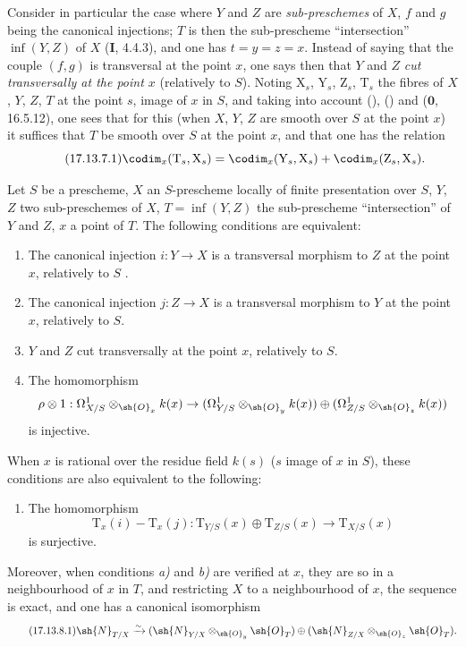 \begin{env}[17.13.7]
\label{IV.17.13.7}
Consider in particular the case where $Y$ and $Z$ are \emph{sub-preschemes} of $X$, $f$ and $g$ being the canonical injections; $T$ is then the sub-prescheme ``intersection'' $\inf(Y,Z)$ of $X$ (\textbf{I}, 4.4.3), and one has $t=y=z=x$.
Instead of saying that the couple $(f,g)$ is transversal at the point $x$, one says then that $Y$ and $Z$ \emph{cut transversally at the point $x$} (relatively to $S$).
Noting $\mathrm{X}_s$, $\mathrm{Y}_s$, $\mathrm{Z}_s$, $\mathrm{T}_s$ the fibres of $X$, $Y$, $Z$, $T$ at the point $s$, image of $x$ in $S$, and taking into account (), () and ($\mathbf{0}$, 16.5.12), one sees that for this (when $X$, $Y$, $Z$ are smooth over $S$ at the point $x$) it suffices that $T$ be smooth over $S$ at the point $x$, and that one has the relation
\[
\label{IV.17.13.7.1}
\tag{17.13.7.1}
\codim_x(\mathrm{T}_s,\mathrm{X}_s) = \codim_x(\mathrm{Y}_s,\mathrm{X}_s) + \codim_x(\mathrm{Z}_s,\mathrm{X}_s).
\]
\end{env}

\begin{proposition}[17.13.8]
\label{IV.17.13.8}
Let $S$ be a prescheme, $X$ an $S$-prescheme locally of finite presentation over $S$, $Y$, $Z$ two sub-preschemes of $X$, $T=\inf(Y,Z)$ the sub-prescheme ``intersection'' of $Y$ and $Z$, $x$ a point of $T$.
The following conditions are equivalent:
\begin{enumerate}
  \item[a)] The canonical injection $i:Y\to X$ is a transversal morphism to $Z$ at the point $x$, relatively to $S$ .
  \item[a${}'$)] The canonical injection $j:Z\to X$ is a transversal morphism to $Y$ at the point $x$, relatively to $S$.
  \item[a${}''$)] $Y$ and $Z$ cut transversally at the point $x$, relatively to $S$.
  \item[b)] The homomorphism
  \[
    \rho\otimes 1: \Omega^1_{X/S}\otimes_{\sh{O}_x}k(x) \to (\Omega^1_{Y/S}\otimes_{\sh{O}_y}k(x))\oplus(\Omega^1_{Z/S}\otimes_{\sh{O}_z}k(x))
  \]
  is injective.
\end{enumerate}
When $x$ is rational over the residue field $k(s)$ ($s$ image of $x$ in $S$), these conditions are also equivalent to the following:
\begin{enumerate}
  \item[b${}'$)] The homomorphism
  \[
    \mathrm{T}_x(i)-\mathrm{T}_x(j): \mathrm{T}_{Y/S}(x)\oplus\mathrm{T}_{Z/S}(x) \to \mathrm{T}_{X/S}(x)
  \]
  is surjective.
\end{enumerate}
Moreover, when conditions \emph{a)} and \emph{b)} are verified at $x$, they are so in a neighbourhood of $x$ in $T$, and restricting $X$ to a neighbourhood of $x$, the sequence  is exact, and one has a canonical isomorphism
\[
\label{IV.17.13.8.1}
\tag{17.13.8.1}
\sh{N}_{T/X} \xrightarrow{\sim} (\sh{N}_{Y/X}\otimes_{\sh{O}_y}\sh{O}_T)\oplus(\sh{N}_{Z/X}\otimes_{\sh{O}_z}\sh{O}_T).
\]
\end{proposition}


